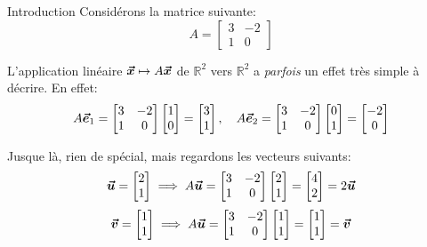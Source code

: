 \documentclass[a4paper]{article}
\begin{document}
\begin{parag}{Introduction}
    Considérons la matrice suivante: 
    \[A = \begin{bmatrix} 3 & -2 \\ 1 & 0 \end{bmatrix} \]
    
    L'application linéaire $\bm{\protect\vec{x}} \mapsto A \bm{\protect\vec{x}}$ de $\mathbb{R}^2$ vers $\mathbb{R}^2$ a \textit{parfois} un effet très simple à décrire. En effet: 
    \[A \bm{\protect\vec{e}}_1 = \begin{bmatrix} 3 & -2 \\ 1 & 0 \end{bmatrix} \begin{bmatrix} 1 \\ 0 \end{bmatrix} = \begin{bmatrix} 3 \\ 1 \end{bmatrix}, \quad A \bm{\protect\vec{e}}_2 = \begin{bmatrix} 3 & -2 \\ 1 & 0 \end{bmatrix} \begin{bmatrix} 0 \\ 1 \end{bmatrix} = \begin{bmatrix} -2 \\ 0 \end{bmatrix} \]
    
    Jusque là, rien de spécial, mais regardons les vecteurs suivants: 
    \[\bm{\protect\vec{u}} = \begin{bmatrix} 2 \\ 1 \end{bmatrix} \implies A \bm{\protect\vec{u}} = \begin{bmatrix} 3 & -2 \\ 1 & 0 \end{bmatrix} \begin{bmatrix} 2 \\ 1 \end{bmatrix} = \begin{bmatrix} 4 \\ 2 \end{bmatrix} = 2\bm{\protect\vec{u}} \]
    \[\bm{\protect\vec{v}} = \begin{bmatrix} 1 \\ 1 \end{bmatrix} \implies A \bm{\protect\vec{u}} = \begin{bmatrix} 3 & -2 \\ 1 & 0 \end{bmatrix} \begin{bmatrix} 1 \\ 1 \end{bmatrix} = \begin{bmatrix} 1 \\ 1 \end{bmatrix} = \bm{\protect\vec{v}} \]


\end{parag}
\end{document}
